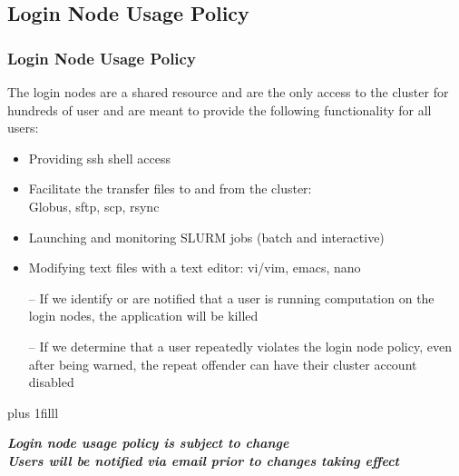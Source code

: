 \documentclass[t,hyperref={pdfpagelabels=false}]{beamer}
\newcommand{\btVFill}{\vskip0pt plus 1filll}
\begin{document}
\subsection{Login Node Usage Policy}
\begin{frame}
\frametitle{Login Node Usage Policy}\footnotesize
The login nodes are a shared resource and are the only access to the cluster for hundreds of user and are meant to provide the following functionality for all users: 
\begin{itemize}
\item Providing ssh shell access 
\item Facilitate the transfer files to and from the cluster:\\Globus, sftp, scp, rsync
\item Launching and monitoring SLURM jobs (batch and interactive)
\item Modifying text files with a text editor: vi/vim, emacs, nano
\end{itemize}
\bigskip
\begin{itemize}
\item[--] If we identify or are notified that a user is running computation on the login nodes, the application will be killed
\item[--] If we determine that a user repeatedly violates the login node policy, even after being warned, the repeat offender can have their cluster account disabled
\end{itemize}
\btVFill
\begin{center}
\footnotesize \textbf{\emph{Login node usage policy is subject to change~\\Users will be notified via email prior to changes taking effect}}
\end{center}
\end{frame}
\end{document}
